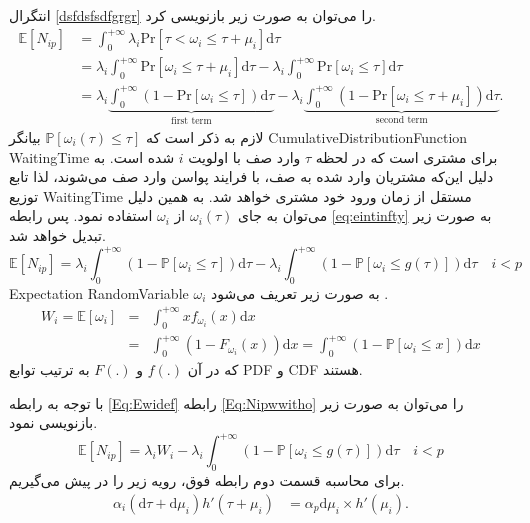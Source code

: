 انتگرال ‎\ref{dsfdsfsdfgrgr}‎ را می‌توان به صورت زیر بازنویسی کرد.
\begin{align}
\mathbb{E}[N_{ip}] &= \int_{0}^{+\infty} \lambda_{i}\mathrm{Pr}[\tau<\omega_{i}\leq \tau+\mu_i]\mathrm{d}\tau \nonumber \\
&=\lambda_{i} \int_{0}^{+\infty}\mathrm{Pr}[\omega_{i} \leq \tau+\mu_i]\mathrm{d}\tau - \lambda_{i} \int_{0}^{+\infty}\mathrm{Pr}[\omega_{i} \leq \tau]\mathrm{d}\tau\nonumber\\
&= \lambda_{i}  \underbrace{\int_{0}^{+\infty}(1-\mathrm{Pr}[\omega_{i} \leq \tau])\mathrm{d}\tau}_\text{first term}  - \lambda_{i} \underbrace{\int_{0}^{+\infty}(1-\mathrm{Pr}[\omega_{i} \leq \tau+\mu_i])\mathrm{d}\tau }_\text{second term} .
\label{eq:eintinfty}
\end{align}
لازم به ذکر است که 
$\mathbb{P}[\omega_{i}(\tau)\leq \tau]$
بیانگر 
\gls{CumulativeDistributionFunction} ‎\gls{WaitingTime}‎
  برای مشتری است که در لحظه $‎\tau$ وارد صف با اولویت $i$ شده است. به دلیل این‌که مشتریان وارد شده به صف، با فرایند پواسن  وارد صف می‌شوند، لذا تابع توزیع ‎\gls{WaitingTime}‎ مستقل از زمان ورود خود مشتری خواهد شد.
به همین دلیل می‌توان به جای  $\omega_{i}(\tau)$ از $\omega_{i}$ استفاده نمود. پس رابطه ‎\ref{eq:eintinfty} به صورت زیر تبدیل خواهد شد.
\begin{equation}
\mathbb{E}[N_{ip}] = \lambda_{i} \int_{0}^{+\infty}\left(1-\mathbb{P}[\omega_{i} \leq \tau]\right)\mathrm{d}\tau-
\lambda_{i} \int_{0}^{+\infty}\left(1-\mathbb{P}[\omega_{i}\leq g(\tau)]\right)\mathrm{d}\tau \quad i< p
\label{Eq:Nipwwitho}
\end{equation}
\gls{Expectation} \gls{RandomVariable} $\omega_{i}$
به صورت زیر تعریف می‌شود
\cite{bassett2000statistics}.
\begin{eqnarray}
W_{i} = \mathbb{E}[\omega_{i}] &=& \int_{0}^{+\infty} x f_{\omega_{i}}(x)\mathrm{d}x \nonumber\\
&=&\int_{0}^{+\infty} \left(1-F_{\omega_{i}}(x)\right)\mathrm{d}x = \int_{0}^{+\infty} \left(1-\mathbb{P}[\omega_{i}\leq x]\right)\mathrm{d}x 
\label{Eq:Ewidef}
\end{eqnarray}
که در آن 
$f(.)$ و $F(.)$
به ترتیب توابع ‎\gls{PDF}‎ و ‎\gls{CDF}‎ هستند.

با توجه به رابطه ‎\ref{Eq:Ewidef}‎ رابطه ‎\ref{Eq:Nipwwitho}‎ را می‌توان به صورت زیر بازنویسی نمود.
\begin{equation}
\mathbb{E}[N_{ip}] = \lambda_{i} W_{i}- \lambda_{i} \int_{0}^{+\infty}\left(1-\mathbb{P}[\omega_{i}\leq g(\tau)]\right)\mathrm{d}\tau \quad i< p
\label{Eq:NEWlambda}
\end{equation}
برای محاسبه قسمت دوم رابطه فوق، رویه زیر را در پیش می‌گیریم.
\begin{align}
\alpha_i(\mathrm{d}\tau + \mathrm{d}\mu_i)h'(\tau+\mu_i) & =
\alpha_p  \mathrm{d}\mu_i \times h'(\mu_i).
\end{align}

